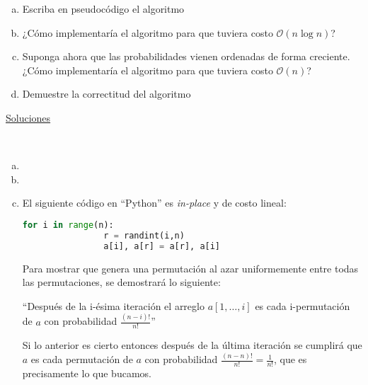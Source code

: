 \documentclass[dcc,uchile]{fcfmcourse}
\begin{document}
\begin{problems}
\begin{enumerate}[a)]
\item Escriba en pseudocódigo el algoritmo
\item ¿Cómo implementaría el algoritmo para que tuviera costo $\mathcal{O}(n\log n)$?
\item Suponga ahora que las probabilidades vienen ordenadas de forma creciente. ¿Cómo implementaría el algoritmo para que tuviera costo $\mathcal{O}(n)$?
\item Demuestre la correctitud del algoritmo 
\end{enumerate}
\end{problems}
\newpage
\begin{center}
{\huge \underline{Soluciones}}
\end{center}
\begin{problems}
\\
\begin{enumerate}[a)]
    \item 
    \item 
    \item El siguiente código en ``Python'' es \textit{in-place} y de costo lineal:
        \begin{lstlisting}[language=Python]
            for i in range(n):
                r = randint(i,n)
                a[i], a[r] = a[r], a[i]
        \end{lstlisting}
        Para mostrar que genera una permutación al azar uniformemente entre todas las permutaciones, se demostrará lo siguiente:
        \begin{center}
        ``Después de la i-ésima iteración el arreglo $a[1,\ldots,i]$ es cada i-permutación de $a$ con probabilidad $\frac{(n-i)!}{n!}$''
        \end{center}
        Si lo anterior es cierto entonces después de la última iteración se cumplirá que $a$ es cada permutación de $a$ con probabilidad $\frac{(n-n)!}{n!} = \frac{1}{n!}$, que es precisamente lo que bucamos.\\
        

\end{enumerate}
\end{problems}
\end{document}
